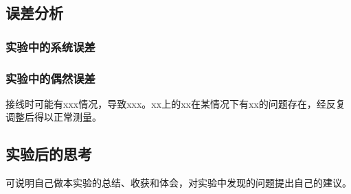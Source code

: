 \documentclass[UTF8]{ctexart}
\begin{document}
\subsection{误差分析}

\subsubsection{实验中的系统误差}


\subsubsection{实验中的偶然误差}
接线时可能有xxx情况，导致xxx。xx上的xx在某情况下有xx的问题存在，经反复调整后得以正常测量。

\subsection{实验后的思考}
可说明自己做本实验的总结、收获和体会，对实验中发现的问题提出自己的建议。

\newpage
\end{document}

